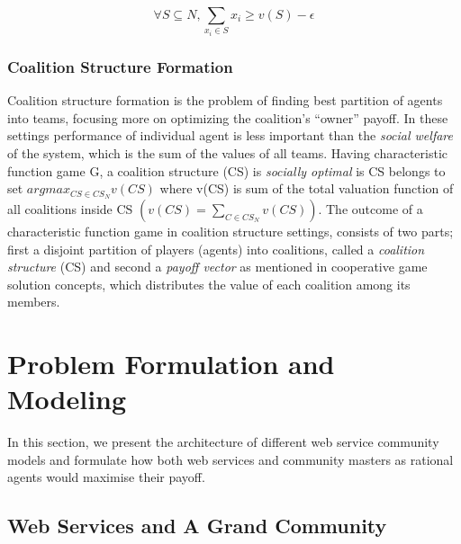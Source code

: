 \documentclass[10pt, conference, compsocconf]{IEEEtran}
\theoremstyle{plain}
\theoremstyle{definition}
\begin{document}
\begin{equation}\label{eq:core}
\forall S \subseteq N, \sum_{x_i \in S} x_i \geq v(S) - \epsilon
\end{equation}

\subsubsection*{Coalition Structure Formation}\label{sec:coalition}

Coalition structure formation is the problem of finding best partition of agents into teams, focusing more on optimizing the coalition's ``owner'' payoff. In these settings performance of individual agent is less important than the \emph{social welfare} of the system, which is the sum of the values of all teams. Having characteristic function game G, a coalition structure (CS) is \emph{socially optimal} is CS belongs to set $argmax_{CS \in CS_N}v(CS)$ where v(CS) is sum of the total valuation function of all coalitions inside CS $(v(CS) = \sum_{C \in CS_N}v(CS))$. The outcome of a characteristic function game in coalition structure settings, consists of two parts; first a disjoint partition of players (agents) into coalitions, called a \emph{coalition structure} (CS) and second a \emph{payoff vector} as mentioned in cooperative game solution concepts, which distributes the value of each coalition among its members.




\section{Problem Formulation and Modeling}\label{s:model}

In this section, we present the architecture of different web service community models and formulate how both web services and community masters as rational agents would maximise their payoff.

\subsection {Web Services and A Grand Community}
\end{document}
